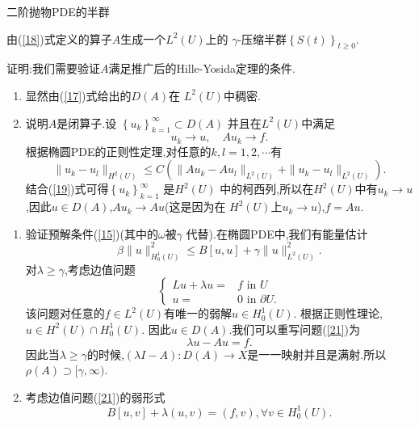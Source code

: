 \begin{frame}[t]{二阶抛物PDE的半群}
  \begin{theorem}
    由{\normalfont(\ref{18})}式定义的算子$A$生成一个$L^2(U)$上的 $\gamma$-压缩半群$\left\{S(t)\right\} _{t\ge 0}$.
  \end{theorem}
  证明:我们需要验证$A$满足推广后的Hille-Yosida定理的条件.
  \begin{enumerate}
    \item [(1)] 显然由(\ref{17})式给出的$D(A)$在 $L^2(U)$中稠密.
    \item [(2)] 说明$A$是闭算子.设 $\left\{u_k\right\} _{k=1}^{\infty}\subset  D(A)$ 并且在$L^2(U)$中满足
      \begin{equation}
	u_k\to u,\quad Au_k\to f.\label{19} 
      \end{equation}
      根据椭圆PDE的正则性定理,对任意的$k,l=1,2,\cdots$有
      \[
	\|u_k-u_l\|_{H^2(U)}\le C \left( \|Au_k-Au_l\|_{L^2(U)}+\|u_k-u_l\|_{L^2(U)} \right) 
      .\] 结合(\ref{19})式可得$\left\{u_k\right\} _{k=1}^{\infty}$ 是$H^2(U)$ 中的柯西列,所以在$H^2(U)$中有$u_k\to u$,因此$u\in D(A)$,$Au_k\to Au$(这是因为在 $H^2(U)$上$u_k\to u$),$f=Au$.
  \end{enumerate}
\end{frame}
\begin{frame}[t]
  \begin{enumerate}
    \item [(3)] 验证预解条件(\ref{15})(其中的$\omega$被$\gamma$ 代替).在椭圆PDE中,我们有能量估计
      \begin{equation}
	\beta \|u\|^2_{H_0^{1}(U)}\le B[u,u] +\gamma \|u\|^2_{L^2(U)}.\label{20}
      \end{equation}
      对$\lambda\ge \gamma$,考虑边值问题
      \begin{equation}\label{21}
        \left\{
	  \begin{aligned}
	    Lu+\lambda u= & f \text{ in }U\\
	    u=&0 \text{ in }\partial U.
	  \end{aligned}
	  \right.
      \end{equation}
      该问题对任意的$f\in L^2(U)$有唯一的弱解$u\in H_0^{1}(U)$. 根据正则性理论,$u \in H^2(U)\cap  H_0^{1}(U)$. 因此$u\in D(A)$.我们可以重写问题(\ref{21})为
      \begin{equation}
        \lambda u -A u=f.
      \end{equation}
      因此当$\lambda\ge \gamma$的时候,$(\lambda I-A):D(A)\to X$是一一映射并且是满射.所以$\rho(A)\supset[\gamma,\infty)$.
    \item [(4)]考虑边值问题(\ref{21})的弱形式
      \[
	B[u,v]+\lambda (u,v)=(f,v), \forall v \in  H_0^{1}(U).
      \] 
  \end{enumerate}
\end{frame}
